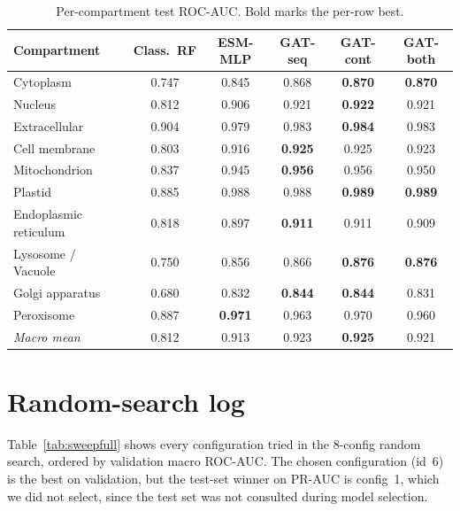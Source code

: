 \documentclass{article}
\begin{document}
\begin{table}[h]
  \caption{Per-compartment test ROC-AUC. Bold marks the per-row best.}
  \label{tab:percomp}
  \centering
  \scriptsize
  \begin{tabular}{lccccc}
    \toprule
    Compartment & Class.\ RF & ESM-MLP & GAT-seq & GAT-cont & GAT-both \\
    \midrule
    Cytoplasm              & 0.747 & 0.845 & 0.868 & \textbf{0.870} & \textbf{0.870} \\
    Nucleus                & 0.812 & 0.906 & 0.921 & \textbf{0.922} & 0.921 \\
    Extracellular          & 0.904 & 0.979 & 0.983 & \textbf{0.984} & 0.983 \\
    Cell membrane          & 0.803 & 0.916 & \textbf{0.925} & 0.925 & 0.923 \\
    Mitochondrion          & 0.837 & 0.945 & \textbf{0.956} & 0.956 & 0.950 \\
    Plastid                & 0.885 & 0.988 & 0.988 & \textbf{0.989} & \textbf{0.989} \\
    Endoplasmic reticulum  & 0.818 & 0.897 & \textbf{0.911} & 0.911 & 0.909 \\
    Lysosome / Vacuole     & 0.750 & 0.856 & 0.866 & \textbf{0.876} & \textbf{0.876} \\
    Golgi apparatus        & 0.680 & 0.832 & \textbf{0.844} & \textbf{0.844} & 0.831 \\
    Peroxisome             & 0.887 & \textbf{0.971} & 0.963 & 0.970 & 0.960 \\
    \midrule
    \emph{Macro mean}      & 0.812 & 0.913 & 0.923 & \textbf{0.925} & 0.921 \\
    \bottomrule
  \end{tabular}
\end{table}

\section{Random-search log}

Table~\ref{tab:sweepfull} shows every configuration tried in the
8-config random search, ordered by validation macro ROC-AUC. The chosen
configuration (id~6) is the best on validation, but the test-set winner
on PR-AUC is config~1, which we did not select, since the test set
was not consulted during model selection.
\end{document}
